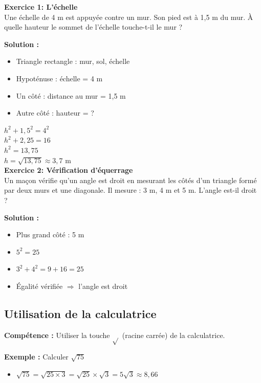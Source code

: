 \begin{exercisebox}
\textbf{Exercice 1: L'échelle}\\

Une échelle de 4 m est appuyée contre un mur. Son pied est à 1,5 m du mur. À quelle hauteur le sommet de l'échelle touche-t-il le mur ?

\textbf{Solution :}

\begin{itemize}
    \item Triangle rectangle : mur, sol, échelle
    \item Hypoténuse : échelle = 4 m
    \item Un côté : distance au mur = 1,5 m
    \item Autre côté : hauteur = ?
\end{itemize}

$h^2 + 1,5^2 = 4^2$\\
$h^2 + 2,25 = 16$\\
$h^2 = 13,75$\\
$h = \sqrt{13,75} \approx 3,7$ m
\\

\textbf{Exercice 2: Vérification d'équerrage}\\

Un maçon vérifie qu'un angle est droit en mesurant les côtés d'un triangle formé par deux murs et une diagonale. Il mesure : 3 m, 4 m et 5 m. L'angle est-il droit ?

\textbf{Solution :}
\begin{itemize}
	\item Plus grand côté : 5 m
	\item $5^2 = 25$
	\item $3^2 + 4^2 = 9 + 16 = 25$
	\item Égalité vérifiée $\Rightarrow$ l'angle est droit
\end{itemize}
\end{exercisebox}

\subsection{Utilisation de la calculatrice}

\textbf{Compétence :} Utiliser la touche $\sqrt{}$ (racine carrée) de la calculatrice.

\textbf{Exemple :} Calculer $\sqrt{75}$
\begin{itemize}
    \item $\sqrt{75} = \sqrt{25 \times 3} = \sqrt{25} \times \sqrt{3} = 5\sqrt{3} \approx 8,66$
\end{itemize}

